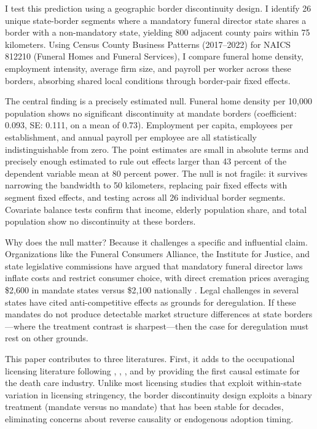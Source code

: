 \documentclass[12pt]{article}
\begin{document}
I test this prediction using a geographic border discontinuity design. I identify 26 unique state-border segments where a mandatory funeral director state shares a border with a non-mandatory state, yielding 800 adjacent county pairs within 75 kilometers. Using Census County Business Patterns (2017--2022) for NAICS 812210 (Funeral Homes and Funeral Services), I compare funeral home density, employment intensity, average firm size, and payroll per worker across these borders, absorbing shared local conditions through border-pair fixed effects.

The central finding is a precisely estimated null. Funeral home density per 10,000 population shows no significant discontinuity at mandate borders (coefficient: 0.093, SE: 0.111, on a mean of 0.73). Employment per capita, employees per establishment, and annual payroll per employee are all statistically indistinguishable from zero. The point estimates are small in absolute terms and precisely enough estimated to rule out effects larger than 43 percent of the dependent variable mean at 80 percent power. The null is not fragile: it survives narrowing the bandwidth to 50 kilometers, replacing pair fixed effects with segment fixed effects, and testing across all 26 individual border segments. Covariate balance tests confirm that income, elderly population share, and total population show no discontinuity at these borders.

Why does the null matter? Because it challenges a specific and influential claim. Organizations like the Funeral Consumers Alliance, the Institute for Justice, and state legislative commissions have argued that mandatory funeral director laws inflate costs and restrict consumer choice, with direct cremation prices averaging \$2,600 in mandate states versus \$2,100 nationally \citep{fca2023pricing}. Legal challenges in several states have cited anti-competitive effects as grounds for deregulation. If these mandates do not produce detectable market structure differences at state borders---where the treatment contrast is sharpest---then the case for deregulation must rest on other grounds.

This paper contributes to three literatures. First, it adds to the occupational licensing literature following \citet{kleiner2006licensing}, \citet{thornton2010impacts}, \citet{blair2019occupational}, and \citet{kleiner2023licensing} by providing the first causal estimate for the death care industry. Unlike most licensing studies that exploit within-state variation in licensing stringency, the border discontinuity design exploits a binary treatment (mandate versus no mandate) that has been stable for decades, eliminating concerns about reverse causality or endogenous adoption timing.
\end{document}
